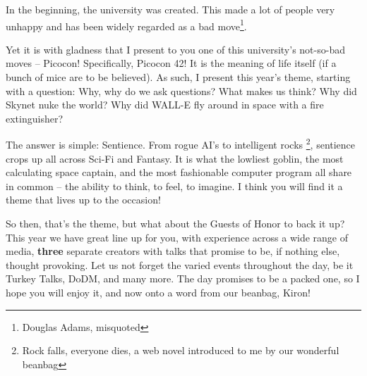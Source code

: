 In the beginning, the university was created. This made a lot of people very unhappy and has been widely regarded as a bad move\footnote{Douglas Adams, misquoted}.

Yet it is with gladness that I present to you one of this university's not-so-bad moves -- Picocon! Specifically, Picocon 42! It is the meaning of life itself (if a bunch of mice are to be believed). As such, I present this year's theme, starting with a question: Why, why do we ask questions? What makes us think? Why did Skynet nuke the world? Why did WALL-E fly around in space with a fire extinguisher?

The answer is simple: Sentience. From rogue AI's to intelligent rocks \footnote{Rock falls, everyone dies, a web novel introduced to me by our wonderful beanbag}, sentience crops up all across Sci-Fi and Fantasy. It is what the lowliest goblin, the most calculating space captain, and the most fashionable computer program all share in common -- the ability to think, to feel, to imagine. I think you will find it a theme that lives up to the occasion!

So then, that's the theme, but what about the Guests of Honor to back it up? This year we have great line up for you, with experience across a wide range of media, \textbf{three} separate creators with talks that promise to be, if nothing else,  thought provoking. Let us not forget the varied events throughout the day, be it Turkey Talks, DoDM, and many more. The day promises to be a packed one, so I hope you will enjoy it, and now onto a word from our beanbag, Kiron!
